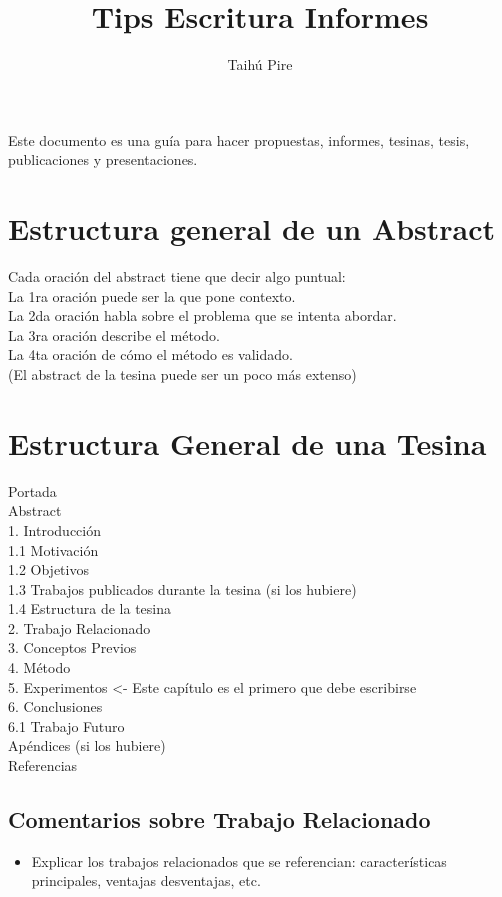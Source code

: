 \documentclass[a4paper,	11pt]{article}
\begin{document}
\title{Tips Escritura Informes}
\author{Taihú Pire}


\tableofcontents

\maketitle


Este documento es una guía para hacer propuestas, informes, tesinas, tesis, publicaciones y presentaciones.

\section{Estructura general de un Abstract}
Cada oración del abstract tiene que decir algo puntual:\\
La 1ra oración puede ser la que pone contexto.\\
La 2da oración habla sobre el problema que se intenta abordar.\\
La 3ra oración describe el método.\\
La 4ta oración de cómo el método es validado.\\
(El abstract de la tesina puede ser un poco más extenso)

\section{Estructura General de una Tesina}
Portada\\
Abstract\\
1. Introducción\\
1.1 Motivación\\
1.2 Objetivos\\
1.3 Trabajos publicados durante la tesina (si los hubiere)\\
1.4 Estructura de la tesina\\
2. Trabajo Relacionado\\
3. Conceptos Previos\\
4. Método\\
5. Experimentos <- Este capítulo es el primero que debe escribirse\\
6. Conclusiones\\
6.1 Trabajo Futuro\\
Apéndices (si los hubiere)\\
Referencias

\subsection{Comentarios sobre Trabajo Relacionado}
\begin{itemize}
    \item Explicar los trabajos relacionados que se referencian: características principales, ventajas desventajas, etc.
\end{itemize}
\end{document}
